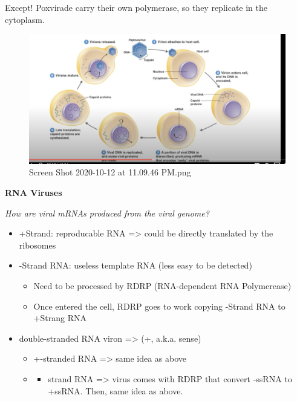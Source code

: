 \documentclass[letterpaper]{article}
\begin{document}
\begin{enumerate}
Except! Poxvirade carry their own polymerase, so they replicate in the
cytoplasm.

\begin{figure}[htbp]
\centering
\includegraphics[width=.9\linewidth]{Screen Shot 2020-10-12 at 11.09.46 PM.png}
\caption{Screen Shot 2020-10-12 at 11.09.46 PM.png}
\end{figure}

\textbf{RNA Viruses}

\emph{How are viral mRNAs produced from the viral genome?}

\begin{itemize}
\item +Strand: reproducable RNA => could be directly translated by the
ribosomes
\item -Strand RNA: useless template RNA (less easy to be detected)

\begin{itemize}
\item Need to be processed by RDRP (RNA-dependent RNA Polymerease)
\item Once entered the cell, RDRP goes to work copying -Strand RNA to
+Strang RNA
\end{itemize}

\item double-stranded RNA viron => (+, a.k.a. sense)

\begin{itemize}
\item +-stranded RNA => same idea as above

\item \begin{itemize}
\item strand RNA => virus comes with RDRP that convert -ssRNA to +ssRNA.
Then, same idea as above.
\end{itemize}
\end{itemize}
\end{itemize}


\end{enumerate}
\end{document}
